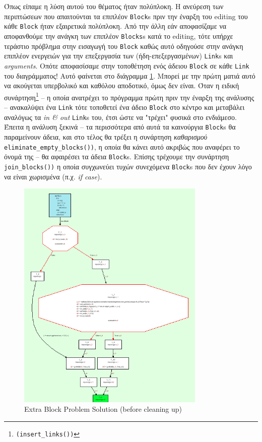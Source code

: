 Όπως είπαμε η λύση αυτού του θέματος ήταν πολύπλοκη. Η ανεύρεση των περιπτώσεων
που απαιτούνται τα επιπλέον \texttt{Block}s πριν την έναρξη του editing του κάθε
\texttt{Block} ήταν εξαιρετικά πολύπλοκη. Από την άλλη εάν αποφασίζαμε να
αποφανθούμε την ανάγκη των επιπλέον \texttt{Blocks}s κατά το editing, τότε
υπήρχε τεράστιο πρόβλημα στην εισαγωγή του \texttt{Block} καθώς αυτό οδηγούσε
στην ανάγκη επιπλέον ενεργειών για την επεξεργασία των (ήδη-επεξεργασμένων)
\texttt{Link}s και \textit{arguments}. Οπότε αποφασίσαμε στην τοποθέτηση ενός
άδειου \texttt{Block} σε κάθε \texttt{Link} του διαγράμματος! Αυτό φαίνεται στο
διάγραμμα \ref {figure-8c}. Μπορεί με την πρώτη ματιά αυτό να ακούγεται
υπερβολικό και καθόλου αποδοτικό, όμως δεν είναι. Όταν η ειδική
συνάρτηση\footnote{\texttt{(insert\_links())}} – η οποία ανατρέχει το πρόγραμμα
πρώτη πριν την έναρξη της ανάλυσης – ανακαλύψει ένα \texttt{Link} τότε τοποθετεί
ένα άδειο \texttt{Block} στο κέντρο και μεταβάλει αναλόγως τα \textit{in \& out}
\texttt{Link}s του, έτσι ώστε να "τρέχει" φυσικά στο ενδιάμεσο. Έπειτα η ανάλυση
ξεκινά – τα περισσότερα από αυτά τα καινούργια \texttt{Block}s θα παραμείνουν
άδεια, και στο τέλος θα τρέξει η συνάρτηση \textit{καθαρισμού}
\texttt{eliminate\_empty\_blocks())}, η οποία θα κάνει αυτό ακριβώς που αναφέρει
το όνομά της – θα αφαιρέσει τα άδεια \texttt{Block}s. Επίσης τρέχουμε την
συνάρτηση \texttt{join\_blocks())} η οποία συγχωνεύει τυχών συνεχόμενα
\texttt{Block}s που δεν έχουν λόγο να είναι χωρισμένα (π.χ. \textit{if case}).

\begin{figure}[h]
\centering
\includegraphics[width=0.8\textwidth]{needs-extra-block-med.png}
\caption{Extra Block Problem Solution (before cleaning up)}
\label{figure-8c}
\end{figure}


